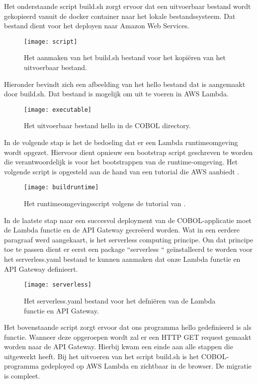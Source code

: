 \newpage
Het onderstaande script build.sh zorgt ervoor dat een uitvoerbaar bestand wordt gekopieerd vanuit de docker container naar het lokale bestandssysteem. Dat bestand dient voor het deployen naar Amazon Web Services. 

  \begin{figure}[h]
    \centering
    \texttt{[image: script]}
    \caption{Het aanmaken van het build.sh bestand voor het kopiëren van het uitvoerbaar bestand.}
\end{figure}

Hieronder bevindt zich een afbeelding van het hello bestand dat is aangemaakt door build.sh. Dat bestand is mogelijk om uit te voeren in AWS Lambda.

  \begin{figure}[h]
    \centering
    \texttt{[image: executable]}
    \caption{Het uitvoerbaar bestand hello in de COBOL directory.}
\end{figure}

\newpage
In de volgende stap is het de bedoeling dat er een Lambda runtimeomgeving wordt opgezet. Hiervoor dient opnieuw een bootstrap script geschreven te worden die verantwoordelijk is voor het bootstrappen van de runtime-omgeving. Het volgende script is opgesteld aan de hand van een tutorial die AWS aanbiedt \autocite{AWS2022}. 

 \begin{figure}[h]
    \centering
    \texttt{[image: buildruntime]}
    \caption{Het runtimeomgevingsscript volgens de tutorial van \autocite{AWS2022}.}
\end{figure}

In de laatste stap naar een succesvol deployment van de COBOL-applicatie moet de Lambda functie en de API Gateway gecreëerd worden. Wat in een eerdere paragraaf werd aangekaart, is het serverless computing principe. Om dat principe toe te passen dient er eerst een package ``serverless `` geïnstalleerd te worden voor het serverless.yaml bestand te kunnen aanmaken dat onze Lambda functie en API Gateway definieert. 

 \begin{figure}[h]
    \centering
    \texttt{[image: serverless]}
    \caption{Het serverless.yaml bestand voor het defniëren van de Lambda functie en API Gateway.}
\end{figure}

\newpage

Het bovenstaande script zorgt ervoor dat ons programma hello gedefinieerd is als functie. Wanneer deze opgeroepen wordt zal er een HTTP GET request gemaakt worden naar de API Gateway. Hierbij kwam een einde aan alle stappen die \textcite{Paika2020} uitgewerkt heeft. Bij het uitvoeren van het script build.sh is het COBOL-programma gedeployed op AWS Lambda en zichtbaar in de browser. De migratie is compleet.


